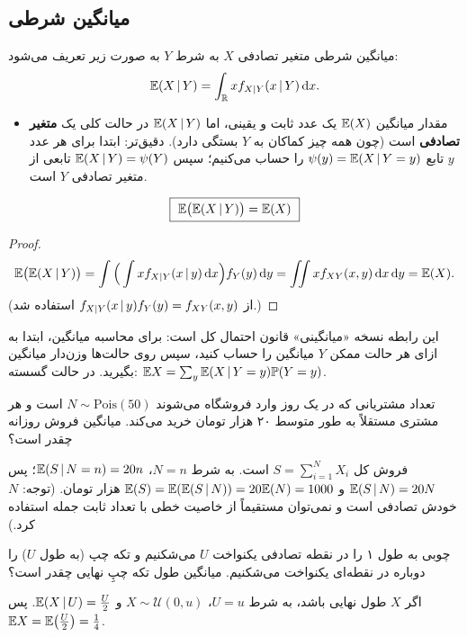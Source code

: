 \subsection{میانگین شرطی }
\begin{definition}
میانگین شرطی متغیر تصادفی $X$ به شرط $Y$ به صورت زیر تعریف می‌شود:
\[
\mathbb{E}(X\,|\, Y)=\int_{\mathbb{R}} xf_{X|Y}(x\,|\, Y)\,\mathrm{d} x .
\]
\end{definition}
\begin{itemize}
\item مقدار میانگین $\mathbb{E}(X)$ یک عدد ثابت و یقینی، اما $\mathbb{E}(X\,|\, Y)$ در حالت کلی یک \textcolor{red!70!black}{\textbf{متغیر تصادفی}} است (چون همه چیز کماکان به $Y$ بستگی دارد). دقیق‌تر: ابتدا برای هر عدد $y$ تابع $\psi(y)=\mathbb{E}(X\,|\, Y=y)$ را حساب می‌کنیم؛ سپس $\mathbb{E}(X\,|\, Y)=\psi(Y)$ تابعی از متغیر تصادفی $Y$ است.
\end{itemize}

\begin{theorem}
\[
\boxed{\ \mathbb{E}\big(\mathbb{E}(X\,|\, Y)\big)=\mathbb{E}(X)\ }
\]
\end{theorem}
\begin{proof}
\[
\mathbb{E}\big(\mathbb{E}(X\,|\, Y)\big)=\int\Big(\int xf_{X|Y}(x\,|\, y)\,\mathrm{d} x\Big)f_Y(y)\,\mathrm{d} y=\iint xf_{XY}(x,y)\,\mathrm{d} x\,\mathrm{d} y=\mathbb{E}(X).
\]
(از $f_{X|Y}(x\,|\, y)f_Y(y)=f_{XY}(x,y)$ استفاده شد.)
\end{proof}
این رابطه نسخه «میانگینی» قانون احتمال کل است: برای محاسبه میانگین، ابتدا به ازای هر حالت ممکن $Y$ میانگین را حساب کنید، سپس روی حالت‌ها وزن‌دار میانگین بگیرید. در حالت گسسته: $\mathbb{E} X=\sum_y\mathbb{E}(X\,|\, Y=y)\mathbb{P}(Y=y)$.

\begin{example}
تعداد مشتریانی که در یک روز وارد فروشگاه می‌شوند $N\sim\mathrm{Pois}(50)$ است و هر مشتری مستقلاً به طور متوسط ۲۰ هزار تومان خرید می‌کند. میانگین فروش روزانه چقدر است؟
\begin{solution}
فروش کل $S=\sum_{i=1}^NX_i$ است. به شرط $N=n$، $\mathbb{E}(S\,|\, N=n)=20n$؛ پس $\mathbb{E}(S\,|\, N)=20N$ و
$\mathbb{E}(S)=\mathbb{E}(\mathbb{E}(S\,|\, N))=20\mathbb{E}(N)=1000$ هزار تومان. (توجه: $N$ خودش تصادفی است و نمی‌توان مستقیماً از خاصیت خطی با تعداد ثابت جمله استفاده کرد.)
\end{solution}
\end{example}

\begin{example}
چوبی به طول ۱ را در نقطه تصادفی یکنواخت $U$ می‌شکنیم و تکه چپ (به طول $U$) را دوباره در نقطه‌ای یکنواخت می‌شکنیم. میانگین طول تکه چپِ نهایی چقدر است؟
\begin{solution}
اگر $X$ طول نهایی باشد، به شرط $U=u$، $X\sim\mathcal U(0,u)$ و $\mathbb{E}(X\,|\, U)=\frac U2$. پس $\mathbb{E} X=\mathbb{E}\big(\frac U2\big)=\frac14$.
\end{solution}
\end{example}

